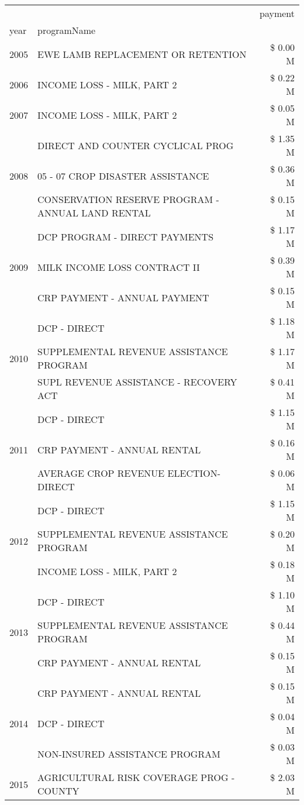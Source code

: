 \begin{tabular}{llr}
\toprule
 &  & payment \\
year & programName &  \\
\midrule
2005 & EWE LAMB REPLACEMENT OR RETENTION & \$ 0.00 M \\
\cline{1-3}
2006 & INCOME LOSS - MILK, PART 2 & \$ 0.22 M \\
\cline{1-3}
2007 & INCOME LOSS - MILK, PART 2 & \$ 0.05 M \\
\cline{1-3}
\multirow[t]{3}{*}{2008} & DIRECT AND COUNTER CYCLICAL PROG & \$ 1.35 M \\
 & 05 - 07 CROP DISASTER ASSISTANCE & \$ 0.36 M \\
 & CONSERVATION RESERVE PROGRAM - ANNUAL LAND RENTAL & \$ 0.15 M \\
\cline{1-3}
\multirow[t]{3}{*}{2009} & DCP PROGRAM - DIRECT PAYMENTS & \$ 1.17 M \\
 & MILK INCOME LOSS CONTRACT II & \$ 0.39 M \\
 & CRP PAYMENT - ANNUAL PAYMENT & \$ 0.15 M \\
\cline{1-3}
\multirow[t]{3}{*}{2010} & DCP - DIRECT & \$ 1.18 M \\
 & SUPPLEMENTAL REVENUE ASSISTANCE PROGRAM & \$ 1.17 M \\
 & SUPL REVENUE ASSISTANCE - RECOVERY ACT & \$ 0.41 M \\
\cline{1-3}
\multirow[t]{3}{*}{2011} & DCP - DIRECT & \$ 1.15 M \\
 & CRP PAYMENT - ANNUAL RENTAL & \$ 0.16 M \\
 & AVERAGE CROP REVENUE ELECTION-DIRECT & \$ 0.06 M \\
\cline{1-3}
\multirow[t]{3}{*}{2012} & DCP - DIRECT & \$ 1.15 M \\
 & SUPPLEMENTAL REVENUE ASSISTANCE PROGRAM & \$ 0.20 M \\
 & INCOME LOSS - MILK, PART 2 & \$ 0.18 M \\
\cline{1-3}
\multirow[t]{3}{*}{2013} & DCP - DIRECT & \$ 1.10 M \\
 & SUPPLEMENTAL REVENUE ASSISTANCE PROGRAM & \$ 0.44 M \\
 & CRP PAYMENT - ANNUAL RENTAL & \$ 0.15 M \\
\cline{1-3}
\multirow[t]{3}{*}{2014} & CRP PAYMENT - ANNUAL RENTAL & \$ 0.15 M \\
 & DCP - DIRECT & \$ 0.04 M \\
 & NON-INSURED ASSISTANCE PROGRAM & \$ 0.03 M \\
\cline{1-3}
\multirow[t]{3}{*}{2015} & AGRICULTURAL RISK COVERAGE PROG - COUNTY & \$ 2.03 M \\

\end{tabular}
